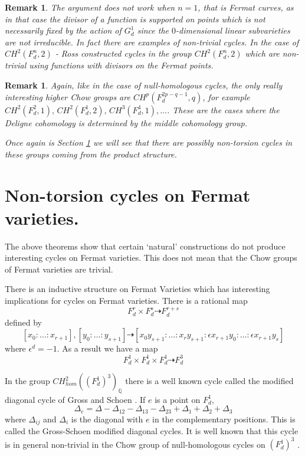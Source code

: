 \documentclass[12pt,reqno]{article}
\newtheorem{rem}[defn]{Remark}
\newcommand {\Q}{{\mathds Q}}
\begin{document}
	\begin{rem} The argument does not work when $n=1$, that is Fermat curves, as in that case the divisor of a function is supported on points which is not necessarily fixed by the action of $G_d^1$ since the $0$-dimensional linear subvarieties are not irreducible. 
		 In fact there are examples of non-trivial cycles. In the case of  $CH^2(F_d^n,2)$ - Ross \cite{ross}  constructed cycles in the group $CH^2(F_d^n,2)$ which are non-trivial using functions with divisors on the Fermat points. 
		\end{rem} 
		
		
\begin{rem} Again, like in the case of null-homologous cycles, the only really interesting higher Chow groups are $CH^p(F_d^{2p-q-1},q)$,  for example $CH^2(F_d^2,1),\, CH^2(F_d^1,2),\, CH^3(F_d^4,1), \dots$. These are the cases where the Deligne cohomology is determined by the middle cohomology group. 
	
Once again is Section \ref{nontorsion} we will see that there are possibly non-torsion cycles in these groups coming from the product structure. 
	\end{rem}



\section{Non-torsion cycles on  Fermat varieties.}
\label{nontorsion}

The above theorems show that certain `natural' constructions do not produce interesting cycles on Fermat varieties. This does not mean that the Chow groups of Fermat varieties are trivial. 

There is an inductive structure on Fermat Varieties which has interesting implications for  cycles on Fermat varieties. There is a rational map 
%
$$F_d^r \times F_d^s \dashrightarrow F^{r+s}_d$$
%
defined by 
%
$$[x_0:\dots:x_{r+1}],[y_0:\dots:y_{s+1}] \dashrightarrow [x_0 y_{s+1}:\dots:x_r y_{s+1}:\epsilon x_{r+1}y_0:\dots:\epsilon x_{r+1}y_s]$$ 
%
where $\epsilon^{d}=-1$. As a result we have a map 
%
$$F_d^1 \times F_d^1 \times F_d^1 \dashrightarrow F_d^3$$

In the group $CH^2_{hom}((F_d^1)^3)_{\Q}$ there is a well known cycle called the modified diagonal cycle of Gross and Schoen \cite{grsc}. If $e$ is a point on $F_d^1$, 
%
$$\Delta_e=\Delta-\Delta_{12}-\Delta_{13}-\Delta_{23}+\Delta_1+\Delta_2+\Delta_3$$
%
where $\Delta_{ij}$ and $\Delta_i$ is the diagonal with $e$ in the complementary positions.
This is called the Gross-Schoen modified diagonal cycles. It is well known that this cycle is in general non-trivial in the Chow group of null-homologous cycles on $(F_d^1)^3$ \cite{otsu}. 
\end{document}
